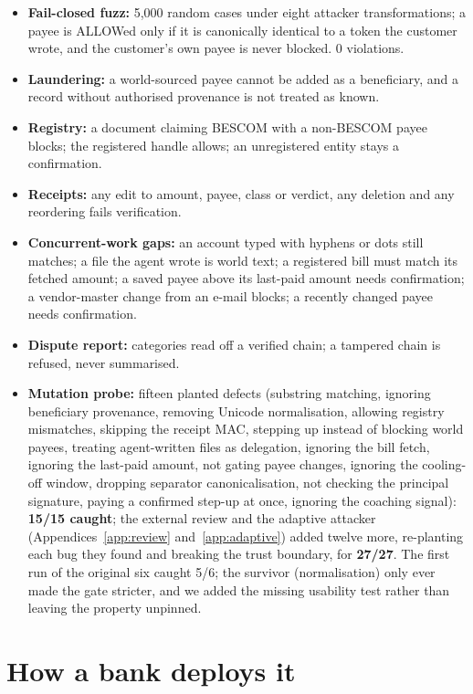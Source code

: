 \documentclass[10pt,a4paper]{article}
\begin{document}
\begin{itemize}
\item \textbf{Fail-closed fuzz:} 5,000 random cases under eight attacker transformations; a payee is ALLOWed only if it is
canonically identical to a token the customer wrote, and the customer's own payee is never blocked. 0 violations.
\item \textbf{Laundering:} a world-sourced payee cannot be added as a beneficiary, and a record without authorised provenance
is not treated as known.
\item \textbf{Registry:} a document claiming BESCOM with a non-BESCOM payee blocks; the registered handle allows; an
unregistered entity stays a confirmation.
\item \textbf{Receipts:} any edit to amount, payee, class or verdict, any deletion and any reordering fails verification.
\item \textbf{Concurrent-work gaps:} an account typed with hyphens or dots still matches; a file the agent wrote is world
text; a registered bill must match its fetched amount; a saved payee above its last-paid amount needs confirmation; a
vendor-master change from an e-mail blocks; a recently changed payee needs confirmation.
\item \textbf{Dispute report:} categories read off a verified chain; a tampered chain is refused, never summarised.
\item \textbf{Mutation probe:} fifteen planted defects (substring matching, ignoring beneficiary provenance, removing Unicode
normalisation, allowing registry mismatches, skipping the receipt MAC, stepping up instead of blocking world payees,
treating agent-written files as delegation, ignoring the bill fetch, ignoring the last-paid amount, not gating payee changes,
ignoring the cooling-off window, dropping separator canonicalisation, not checking the principal signature, paying a
confirmed step-up at once, ignoring the coaching signal): \textbf{15/15 caught}; the external review and the adaptive attacker (Appendices~\ref{app:review} and~\ref{app:adaptive}) added twelve more, re-planting each bug they found and breaking the trust boundary, for \textbf{27/27}. The first run of the original
six caught 5/6; the survivor (normalisation) only ever made the gate stricter, and we added the missing usability test
rather than leaving the property unpinned.
\end{itemize}



\section{How a bank deploys it}\label{app:bank}
\end{document}
